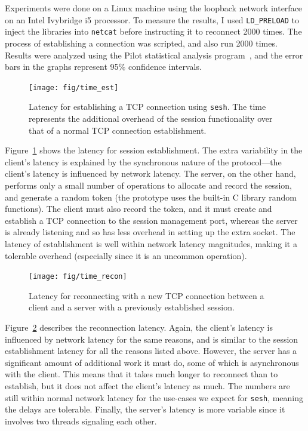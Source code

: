 \documentclass[twocolumn,11pt]{article}
\newcommand{\sesh}{\texttt{sesh}\xspace}
\begin{document}
Experiments were done on a Linux machine using the loopback network
interface on an Intel Ivybridge i5 processor. To measure the results, I used
\texttt{LD\_PRELOAD} to inject the libraries into \texttt{netcat} before
instructing it to reconnect 2000 times. The process of establishing a connection
was scripted, and also run 2000 times. Results were analyzed using the Pilot
statistical analysis program~\cite{pilot}, and the error bars in the graphs
represent 95\% confidence intervals.

\begin{figure}[!htb]
	\centering
	\texttt{[image: fig/time\_est]}
	\caption{Latency for establishing a TCP connection using \sesh. The time
	represents the additional overhead of the session functionality over that of
	a normal TCP connection establishment.}
	\label{fig:est}
\end{figure}

Figure~\ref{fig:est} shows the latency for session establishment. The extra
variability in the client's latency is explained by the synchronous nature of
the protocol---the client's latency is influenced by network latency. The
server, on the other hand, performs only a small number of operations to
allocate and record the session, and generate a random token (the prototype uses
the built-in C library random functions). The client must also record the token,
and it must create and establish a TCP connection to the session management
port, whereas the server is already listening and so has less overhead in
setting up the extra socket.
The latency of establishment is well within network latency magnitudes, making
it a tolerable overhead (especially since it is an uncommon operation).

\begin{figure}[!htb]
	\centering
	\texttt{[image: fig/time\_recon]}
	\caption{Latency for reconnecting with a new TCP connection between a client
	and a server with a previously established session.}
	\label{fig:recon}
\end{figure}

Figure~\ref{fig:recon} describes the reconnection latency. Again, the client's
latency is influenced by network latency for the same reasons, and is similar to
the session establishment latency for all the reasons listed above. However, the
server has a significant amount of additional work it must do, some of which is
asynchronous with the client. This means that it takes much longer to reconnect
than to establish, but it does not affect the client's latency as much. The
numbers are still within normal network latency for the use-cases we expect for
\sesh, meaning the delays are tolerable. Finally, the server's latency is more
variable since it involves two threads signaling each other.
\end{document}
